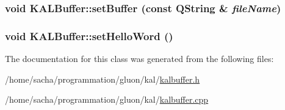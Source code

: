 \hypertarget{class_k_a_l_buffer_2b9b03fd3f9d785a10f28429bcd40e45}{
\subsubsection[{setBuffer}]{\setlength{\rightskip}{0pt plus 5cm}void KALBuffer::setBuffer (const QString \& {\em fileName})}}
\label{class_k_a_l_buffer_2b9b03fd3f9d785a10f28429bcd40e45}


\hypertarget{class_k_a_l_buffer_51db9c1d66fad6ac40ab71518691393e}{
\subsubsection[{setHelloWord}]{\setlength{\rightskip}{0pt plus 5cm}void KALBuffer::setHelloWord ()}}
\label{class_k_a_l_buffer_51db9c1d66fad6ac40ab71518691393e}




The documentation for this class was generated from the following files:\begin{CompactItemize}
\item 
/home/sacha/programmation/gluon/kal/\hyperlink{kalbuffer_8h}{kalbuffer.h}\item 
/home/sacha/programmation/gluon/kal/\hyperlink{kalbuffer_8cpp}{kalbuffer.cpp}\end{CompactItemize}

